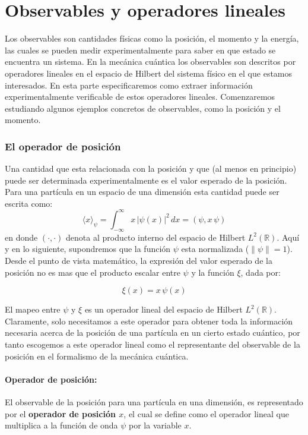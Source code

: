 \documentclass[12pt]{book}
\numberwithin{equation}{chapter}
\def\R{\mathbb{R}}
\def\la{\langle}
\def\ra{\rangle}
\begin{document}
\section{Observables y operadores lineales}
Los observables son cantidades f\'isicas como la posici\'on, el momento y la energ\'ia, las cuales se pueden medir experimentalmente para saber en que estado se encuentra un sistema. En la mec\'anica cu\'antica los observables son descritos por operadores lineales en el espacio de Hilbert del sistema f\'isico en el que estamos interesados. En esta parte especificaremos como extraer informaci\'on experimentalmente verificable de estos operadores lineales. Comenzaremos estudiando algunos ejemplos concretos de observables, como la posici\'on y el momento.

\subsubsection{El operador de posici\'on}
Una cantidad que esta relacionada con la posici\'on y que (al menos en principio) puede ser determinada experimentalmente es el valor esperado de la posici\'on. Para una part\'icula en un espacio de una dimensi\'on esta cantidad puede ser escrita como:
\begin{equation}\label{pos-exp1}
\la x \ra_{\psi}= \int_{-\infty}^{\infty} x\, |\psi(x)|^{2} \, dx = (\psi , x\, \psi)
\end{equation}
en donde $(\cdot , \cdot)$ denota al producto interno del espacio de Hilbert $L^{2}(\R)$. Aqu\'i y en lo siguiente, supondremos que la funci\'on $\psi$ esta normalizada ($\| \psi \|=1$). Desde el punto de vista matem\'atico, la expresi\'on del valor esperado de la posici\'on no es mas que el producto escalar entre $\psi$ y la funci\'on $\xi$, dada por:

\begin{equation}
\xi (x)= x \, \psi (x)
\end{equation}

El mapeo entre $\psi$ y $\xi$ es un operador lineal del espacio de Hilbert $L^{2}(\R)$. Claramente, solo necesitamos a este operador para obtener toda la informaci\'on necesaria acerca de la posici\'on de una part\'icula en un cierto estado cu\'antico, por tanto escogemos a este operador lineal como el representante del observable de la posici\'on en el formalismo de la mec\'anica cu\'antica.

\paragraph{Operador de posici\'on:} 
El observable de la posici\'on para una part\'icula en una dimensi\'on, es representado por el {\bf operador de posici\'on $x$}, el cual se define como el operador lineal que multiplica a la funci\'on de onda $\psi$ por la variable $x$.
 
\end{document}

